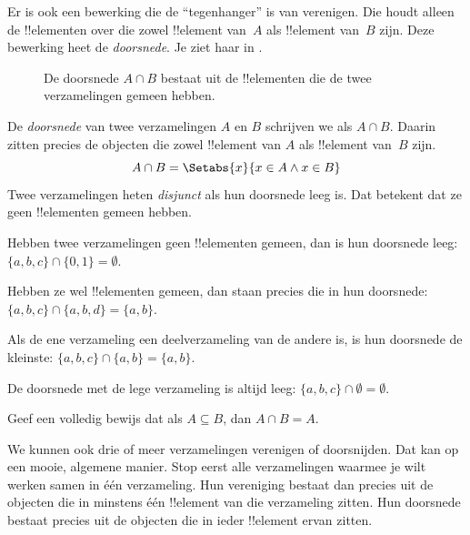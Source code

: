\documentclass[../../../include/open-logic-section]{subfiles}
\begin{document}
\begin{explain}
Er is ook een bewerking die de ``tegenhanger'' is van verenigen. Die houdt
alleen de !!{element}en over die zowel !!{element} van~$A$ als !!{element}
van~$B$ zijn. Deze bewerking heet de \emph{doorsnede}. Je ziet haar in
.
\begin{figure}
  \caption{De doorsnede $A \cap B$ bestaat uit de !!{element}en die de twee
    verzamelingen gemeen hebben.}
\end{figure}
\end{explain}

\begin{defn}[Doorsnede]
De \emph{doorsnede} van twee verzamelingen $A$ en $B$ schrijven we als
$A \cap B$. Daarin zitten precies de objecten die zowel !!{element} van $A$
als !!{element} van~$B$ zijn.
\[
A \cap B = \Setabs{x}{x \in A \land x \in B}
\]
Twee verzamelingen heten \emph{disjunct} als hun doorsnede leeg is. Dat
betekent dat ze geen !!{element}en gemeen hebben.
\end{defn}

\begin{ex}
Hebben twee verzamelingen geen !!{element}en gemeen, dan is hun doorsnede leeg:
$\{ a, b, c\} \cap \{ 0, 1\} = \emptyset$.

Hebben ze wel !!{element}en gemeen, dan staan precies die in hun doorsnede:
$\{a, b, c \} \cap \{a, b, d \} = \{a, b\}$.

Als de ene verzameling een deelverzameling van de andere is, is hun doorsnede
de kleinste: $\{a, b, c\} \cap \{a, b\} = \{a, b\}$.

De doorsnede met de lege verzameling is altijd leeg: $\{a, b, c \}
\cap \emptyset = \emptyset$.
\end{ex}

\begin{prob}
Geef een volledig bewijs dat als $A \subseteq B$, dan $A \cap B = A$.
\end{prob}

\begin{explain}
We kunnen ook drie of meer verzamelingen verenigen of doorsnijden. Dat kan op
een mooie, algemene manier. Stop eerst alle verzamelingen waarmee je wilt
werken samen in één verzameling. Hun
vereniging bestaat dan precies uit de objecten die in minstens één
!!{element} van die verzameling zitten. Hun doorsnede bestaat precies uit de
objecten die in ieder !!{element} ervan zitten.
\end{explain}
\end{document}
